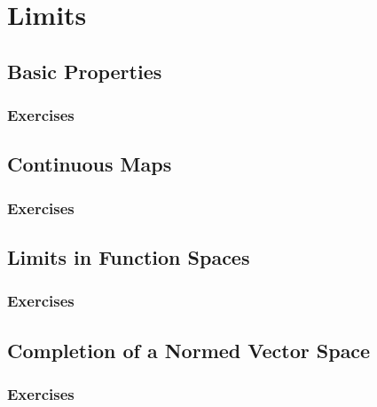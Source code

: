 \setcounter{chapter}{0}
\renewcommand{\thechapter}{7}
\chapter{Limits}\label{ch:7}
\setcounter{equation}{0}	        %

\section{Basic Properties}\label{sec:7.1}
\subsection*{Exercises}\label{sec:7.1_Exercises}
\section{Continuous Maps}\label{sec:7.2}	
\subsection*{Exercises}\label{sec:7.2_Exercises}
\section{Limits in Function Spaces}\label{sec:7.3}	
\subsection*{Exercises}\label{sec:7.3_Exercises}
\section{Completion of a Normed Vector Space}\label{sec:7.4}	
\subsection*{Exercises}\label{sec:7.4_Exercises}
